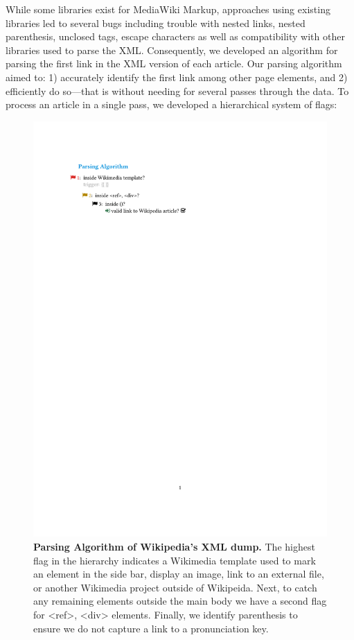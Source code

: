 \documentclass[pre,twocolumn,twoside,superscriptaddress,floatfix]{revtex4-1}
\begin{document}
{While some libraries exist for MediaWiki Markup,
approaches using existing libraries led to several bugs 
including trouble with nested links, nested parenthesis, unclosed tags, escape characters 
as well as compatibility with other libraries used to parse the XML.
Consequently,  we developed an algorithm for parsing the first link in the XML version of each article.
Our parsing algorithm aimed to: 
1) accurately identify the first link among other page elements, and 
2) efficiently do so---that is without needing for several passes through the data.
To process an article in a single pass, we developed a hierarchical system of flags:
\begin{figure}[tp!]
  \includegraphics[width=\columnwidth]{fig015_flags.pdf}  
  \caption{
    \textbf{Parsing Algorithm of Wikipedia's XML dump.}
The highest flag in the hierarchy indicates a Wikimedia template used to mark an element in the side bar, display an image, link to an external file, or another Wikimedia project outside of Wikipeida. Next, to catch any remaining elements outside the main body we have a second flag for <ref>, <div> elements. Finally, we identify parenthesis to ensure we do not capture a link to a pronunciation key.}
  \label{fig:parsing algorithm}
\end{figure}

}
\end{document}
